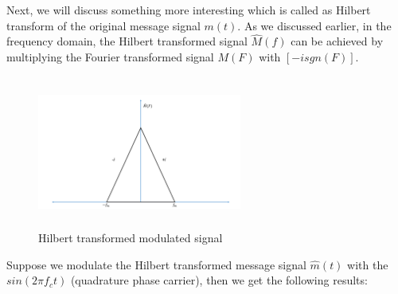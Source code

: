 Next, we will discuss something more interesting which is called as Hilbert transform of the original message signal $m(t)$. As we discussed earlier, in the frequency domain, the Hilbert transformed signal $\hat{M}(f)$ can be achieved by multiplying the Fourier transformed signal $M(F)$ with $[-i sgn(F)]$.
\begin{figure}[h]
	\centering
	\includegraphics[width=0.6\textwidth, height=5cm]{./sdf/simplified_coherent_receiver/figures/SSB3.pdf}
	\caption{Hilbert transformed modulated signal}\label{Hilbert_Transformed_signal}
\end{figure}
Suppose we modulate the Hilbert transformed message signal $\hat{m}(t)$  with the $sin(2\pi f_c t)$ (quadrature phase carrier), then we get the following results:

